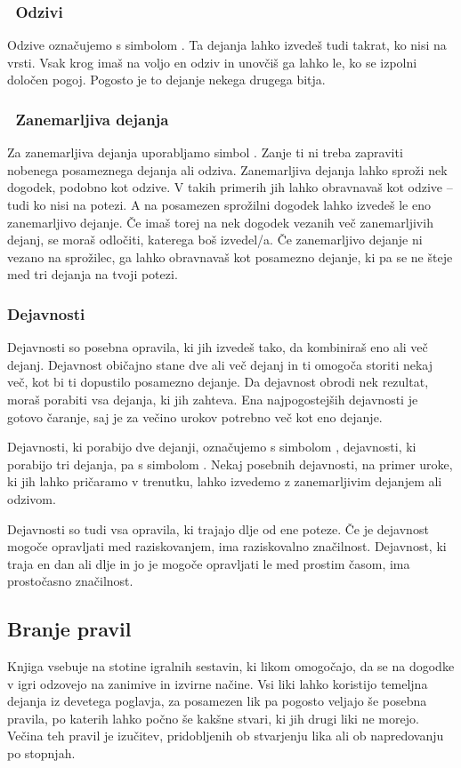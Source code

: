 \subsubsection{\reaction~Odzivi}
Odzive označujemo s simbolom \reaction. Ta dejanja lahko izvedeš tudi takrat, ko nisi na vrsti. Vsak krog imaš na voljo en odziv in unovčiš ga lahko le, ko se izpolni določen pogoj. Pogosto je to dejanje nekega drugega bitja.

\subsubsection{\freeaction~Zanemarljiva dejanja}
Za zanemarljiva dejanja uporabljamo simbol \freeaction. Zanje ti ni treba zapraviti nobenega posameznega dejanja ali odziva. Zanemarljiva dejanja lahko sproži nek dogodek, podobno kot odzive. V takih primerih jih lahko obravnavaš kot odzive -- tudi ko nisi na potezi. A na posamezen sprožilni dogodek lahko izvedeš le eno zanemarljivo dejanje. Če imaš torej na nek dogodek vezanih več zanemarljivih dejanj, se moraš odločiti, katerega boš izvedel/a. Če zanemarljivo dejanje ni vezano na sprožilec, ga lahko obravnavaš kot posamezno dejanje, ki pa se ne šteje med tri dejanja na tvoji potezi.

\subsubsection{Dejavnosti}
Dejavnosti so posebna opravila, ki jih izvedeš tako, da kombiniraš eno ali več dejanj. Dejavnost običajno stane dve ali več dejanj in ti omogoča storiti nekaj več, kot bi ti dopustilo posamezno dejanje. Da dejavnost obrodi nek rezultat, moraš porabiti vsa dejanja, ki jih zahteva. Ena najpogostejših dejavnosti je gotovo čaranje, saj je za večino urokov potrebno več kot eno dejanje.

Dejavnosti, ki porabijo dve dejanji, označujemo s simbolom \twoactions, dejavnosti, ki porabijo tri dejanja, pa s simbolom \threeactions. Nekaj posebnih dejavnosti, na primer uroke, ki jih lahko pričaramo v trenutku, lahko izvedemo z zanemarljivim dejanjem ali odzivom.

Dejavnosti so tudi vsa opravila, ki trajajo dlje od ene poteze. Če je dejavnost mogoče opravljati med raziskovanjem, ima raziskovalno značilnost. Dejavnost, ki traja en dan ali dlje in jo je mogoče opravljati le med prostim časom, ima prostočasno značilnost.

\subsection{Branje pravil}
Knjiga vsebuje na stotine igralnih sestavin, ki likom omogočajo, da se na dogodke v igri odzovejo na zanimive in izvirne načine. Vsi liki lahko koristijo temeljna dejanja iz devetega poglavja, za posamezen lik pa pogosto veljajo še posebna pravila, po katerih lahko počno še kakšne stvari, ki jih drugi liki ne morejo. Večina teh pravil je izučitev, pridobljenih ob stvarjenju lika ali ob napredovanju po stopnjah.

